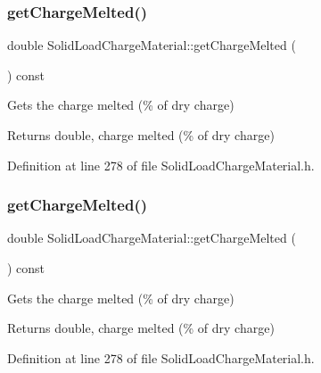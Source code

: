 \subsubsection{\texorpdfstring{get\+Charge\+Melted()}{getChargeMelted()}\hspace{0.1cm}{\footnotesize\ttfamily [2/3]}}
{\footnotesize\ttfamily double Solid\+Load\+Charge\+Material\+::get\+Charge\+Melted (\begin{DoxyParamCaption}{ }\end{DoxyParamCaption}) const\hspace{0.3cm}{\ttfamily [inline]}}

Gets the charge melted (\% of dry charge) \begin{DoxyReturn}{Returns}
double, charge melted (\% of dry charge) 
\end{DoxyReturn}


Definition at line 278 of file Solid\+Load\+Charge\+Material.\+h.

\mbox{\label{class_solid_load_charge_material_ad9ab52fe5861f48b763fe300851df69a}} 
\subsubsection{\texorpdfstring{get\+Charge\+Melted()}{getChargeMelted()}\hspace{0.1cm}{\footnotesize\ttfamily [3/3]}}
{\footnotesize\ttfamily double Solid\+Load\+Charge\+Material\+::get\+Charge\+Melted (\begin{DoxyParamCaption}{ }\end{DoxyParamCaption}) const\hspace{0.3cm}{\ttfamily [inline]}}

Gets the charge melted (\% of dry charge) \begin{DoxyReturn}{Returns}
double, charge melted (\% of dry charge) 
\end{DoxyReturn}


Definition at line 278 of file Solid\+Load\+Charge\+Material.\+h.

\mbox{\label{class_solid_load_charge_material_afcb8c00c2e23ad1444f34960b19835a0}} 
